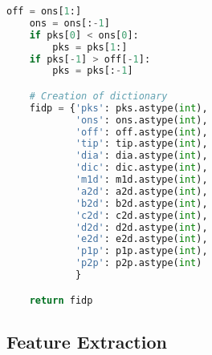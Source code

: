 \begin{lstlisting}[language=Python,label={lst:fidp.py}, basicstyle=\scriptsize]
    off = ons[1:]
    ons = ons[:-1]
    if pks[0] < ons[0]:
        pks = pks[1:]
    if pks[-1] > off[-1]:
        pks = pks[:-1]

    # Creation of dictionary
    fidp = {'pks': pks.astype(int),
            'ons': ons.astype(int),
            'off': off.astype(int),
            'tip': tip.astype(int),
            'dia': dia.astype(int),
            'dic': dic.astype(int),
            'm1d': m1d.astype(int),
            'a2d': a2d.astype(int),
            'b2d': b2d.astype(int),
            'c2d': c2d.astype(int),
            'd2d': d2d.astype(int),
            'e2d': e2d.astype(int),
            'p1p': p1p.astype(int),
            'p2p': p2p.astype(int)
            }

    return fidp

\end{lstlisting}

\vspace{-0.3cm}
\subsection{Feature Extraction}
\label{subsec:code_fe}

